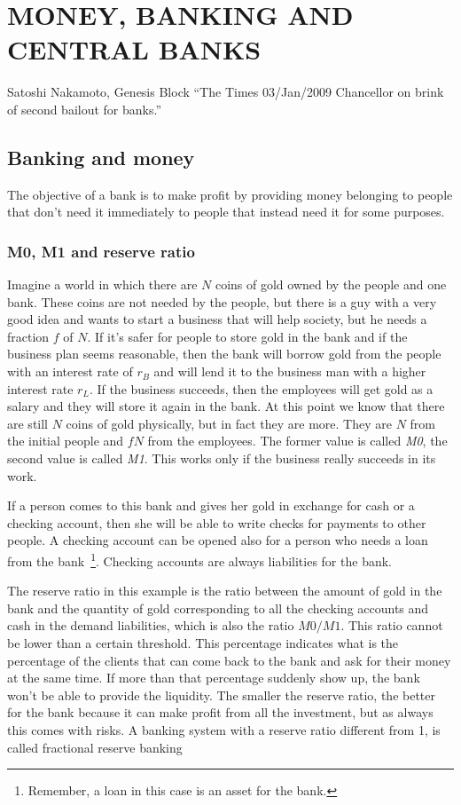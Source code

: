 \chapter{MONEY, BANKING AND CENTRAL BANKS}
\begin{chapquote}{Satoshi Nakamoto, Genesis Block}
``The Times 03/Jan/2009 Chancellor on brink of second bailout for banks.''
\end{chapquote}

\section{Banking and money}
The objective of a bank is to make profit by providing money belonging to people that don't need it immediately to people that instead need it for some purposes.

\subsection{M0, M1 and reserve ratio}
Imagine a world in which there are $N$ coins of gold owned by the people and one bank. These coins are not needed by the people, but there is a guy with a very good idea and wants to start a business that will help society, but he needs a fraction $f$ of $N$. If it's safer for people to store gold in the bank and if the business plan seems reasonable, then the bank will borrow gold from the people with an interest rate of $r_B$ and will lend it to the business man with a higher interest rate $r_L$. If the business succeeds, then the employees will get gold as a salary and they will store it again in the bank. At this point we know that there are still $N$ coins of gold physically, but in fact they are more. They are $N$ from the initial people and $fN$ from the employees. The former value is called \textit{M0}, the second value is called \textit{M1}. This works only if the business really succeeds in its work.

If a person comes to this bank and gives her gold in exchange for cash or a checking account, then she will be able to write checks for payments to other people. A checking account can be opened also for a person who needs a loan from the bank~\footnote{Remember, a loan in this case is an asset for the bank.}. Checking accounts are always liabilities for the bank.

The reserve ratio in this example is the ratio between the amount of gold in the bank and the quantity of gold corresponding to all the checking accounts and cash in the demand liabilities, which is also the ratio $M0/M1$. This ratio cannot be lower than a certain threshold. This percentage indicates what is the percentage of the clients that can come back to the bank and ask for their money at the same time. If more than that percentage suddenly show up, the bank won't be able to provide the liquidity. The smaller the reserve ratio, the better for the bank because it can make profit from all the investment, but as always this comes with risks. A banking system with a reserve ratio different from 1, is called fractional reserve banking

